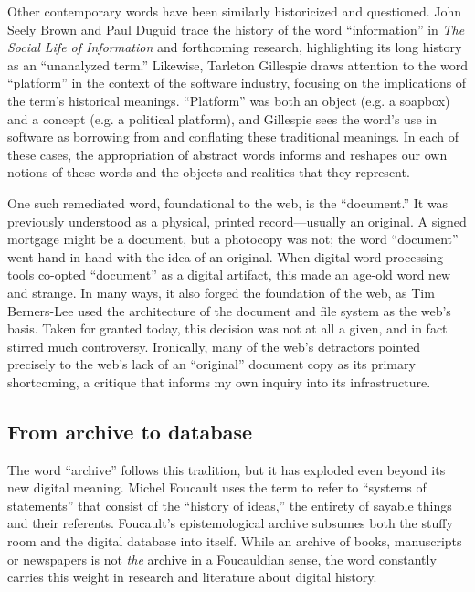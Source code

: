 Other contemporary words have been similarly historicized and questioned. John Seely Brown and Paul Duguid trace the history of the word ``information'' in \emph{The Social Life of Information} and forthcoming research, highlighting its long history as an ``unanalyzed term.''\autocite{brown_social_2002} Likewise, Tarleton Gillespie draws attention to the word ``platform'' in the context of the software industry, focusing on the implications of the term's historical meanings.\autocite{gillespie_politics_2010} ``Platform'' was both an object (e.g. a soapbox) and a concept (e.g. a political platform), and Gillespie sees the word's use in software as borrowing from and conflating these traditional meanings. In each of these cases, the appropriation of abstract words informs and reshapes our own notions of these words and the objects and realities that they represent.

One such remediated word, foundational to the web, is the ``document.'' It was previously understood as a physical, printed record---usually an original. A signed mortgage might be a document, but a photocopy was not; the word ``document'' went hand in hand with the idea of an original. When digital word processing tools co-opted ``document'' as a digital artifact, this made an age-old word new and strange. In many ways, it also forged the foundation of the web, as Tim Berners-Lee used the architecture of the document and file system as the web's basis.\autocite{berners-lee_weaving_2000} Taken for granted today, this decision was not at all a given, and in fact stirred much controversy. Ironically, many of the web's detractors pointed precisely to the web's lack of an ``original'' document copy as its primary shortcoming, a critique that informs my own inquiry into its infrastructure.\autocite[See, e.g.,][ch. 18]{lanier_who_2013,nelson_ted_1999}

\subsection{From archive to database}

The word ``archive'' follows this tradition, but it has exploded even beyond its new digital meaning. Michel Foucault uses the term to refer to ``systems of statements'' that consist of the ``history of ideas,'' the entirety of sayable things and their referents.\autocite[128-129, 137]{foucault_archaeology_1972} Foucault's epistemological archive subsumes both the stuffy room and the digital database into itself. While an archive of books, manuscripts or newspapers is not \emph{the} archive in a Foucauldian sense, the word constantly carries this weight in research and literature about digital history.


